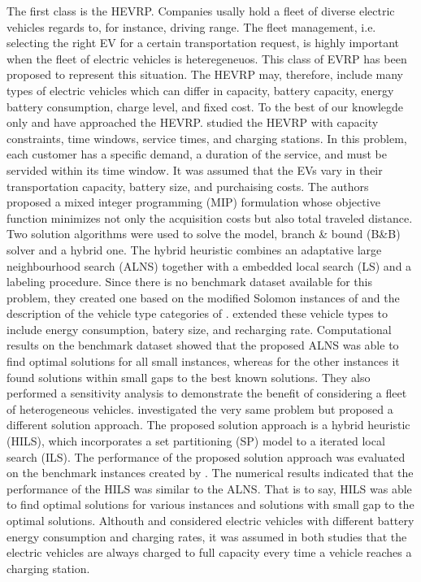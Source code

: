 \documentclass[11pt]{article}
\begin{document}
The first class is the HEVRP. Companies usally hold a fleet of diverse electric vehicles regards to, for instance, driving range. The fleet management, i.e. selecting the right EV for a certain transportation request, is highly important when the fleet of electric vehicles is heteregeneuos. This class of EVRP has been proposed to represent this situation. The HEVRP may, therefore, include many types of electric vehicles which can differ in capacity, battery capacity, energy battery consumption, charge level, and fixed cost. To the best of our knowlegde only  \cite{Hiermann2016} and \cite{Penha2016} have approached the HEVRP. \cite{Hiermann2016} studied the HEVRP with capacity constraints, time windows, service times, and charging stations. In this problem, each customer has a specific demand, a duration of the service, and must be servided within its time window. It was assumed that the EVs vary in their transportation capacity, battery size, and purchaising costs. The authors proposed a mixed integer programming (MIP) formulation whose objective function minimizes not only the acquisition costs but also total traveled distance. Two solution algorithms were used to solve the model, branch \& bound (B\&B) solver and a hybrid one. The hybrid heuristic combines an adaptative large neighbourhood search (ALNS) together with a embedded local search (LS) and a labeling procedure. Since there is no benchmark dataset available for this problem, they created one based on the modified Solomon instances of \cite{Schneider2014} and the description of the vehicle type categories of \cite{Liu1999}. \cite{Hiermann2016} extended these vehicle types to include energy consumption, batery size, and recharging rate. Computational results on the benchmark dataset showed that the proposed ALNS was able to find optimal solutions for all small instances, whereas for the other instances it found solutions within small gaps to the best known solutions. They also performed a sensitivity analysis to demonstrate the benefit of considering a fleet of heterogeneous vehicles. \cite{Penha2016} investigated the very same problem but proposed a different solution approach. The proposed solution approach is a hybrid heuristic (HILS), which incorporates a set partitioning (SP) model to a iterated local search (ILS). The performance of the proposed solution approach was evaluated on the benchmark instances created by \cite{Hiermann2016}. The numerical results indicated that the performance of the HILS was similar to the ALNS. That is to say, HILS was able to find optimal solutions for various instances and solutions with small gap to the optimal solutions. Althouth \cite{Hiermann2016} and \cite{Penha2016} considered electric vehicles with different battery energy consumption and charging rates, it was assumed in both studies that the electric vehicles are always charged to full capacity every time a vehicle reaches a charging station. 
\end{document}

